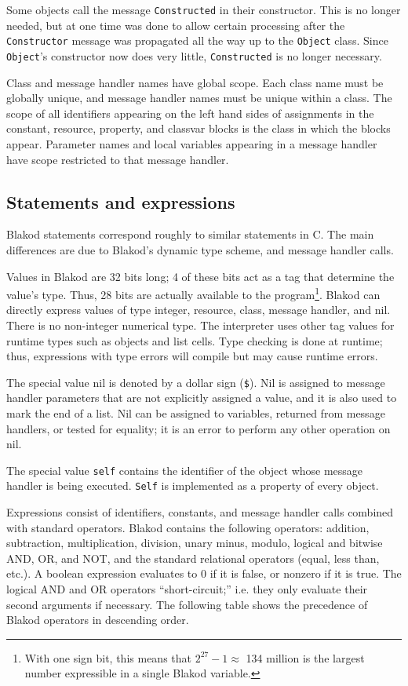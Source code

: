 Some objects call the message {\tt Constructed} in their constructor.
This is no longer needed, but at one time was done to allow certain
processing after the {\tt Constructor} message was propagated
all the way up to the {\tt Object} class.  Since {\tt Object}'s
constructor now does very little, {\tt Constructed} is no longer necessary.

Class and message handler names have global scope. Each class name
must be globally unique, and message handler names must be unique
within a class.  The scope of all identifiers appearing on the left
hand sides of assignments in the constant, resource, property, and
classvar blocks is the class in which the blocks appear.  Parameter
names and local variables appearing in a message handler have scope
restricted to that message handler.

\subsection{Statements and expressions}

Blakod statements correspond roughly to similar statements in C.  The
main differences are due to Blakod's dynamic type scheme, and message
handler calls.

Values in Blakod are 32 bits long; 4 of these bits act as a tag that
determine the value's type.  Thus, 28 bits are actually available to
the program\footnote{With one sign bit, this means that $2^{27} - 1
\approx $
134 million is the largest number expressible in a single Blakod
variable.}.  Blakod can directly express values of type integer,
resource, class, message handler, and nil.  There is no non-integer
numerical type.  The interpreter uses other tag values for runtime
types such as objects and list cells.  Type checking is done at
runtime; thus, expressions with type errors will compile but may cause
runtime errors.

The special value nil is denoted by a dollar sign ({\tt \$}).  Nil is
assigned to message handler parameters that are not explicitly
assigned a value, and it is also used to mark the end of a list.  Nil
can be assigned to variables, returned from message handlers, or
tested for equality; it is an error to perform any other operation on
nil.

The special value {\tt self} contains the identifier of the object
whose message handler is being executed.  {\tt Self} is implemented as a
property of every object.

Expressions consist of identifiers, constants, and message handler
calls combined with standard operators.  Blakod contains the following
operators: addition, subtraction, multiplication, division, unary
minus, modulo, logical and bitwise AND, OR, and NOT, and the standard
relational operators (equal, less than, etc.).  A boolean expression
evaluates to 0 if it is false, or nonzero if it is true.  The logical
AND and OR operators ``short-circuit;'' i.e. they only evaluate their
second arguments if necessary.  The following table shows the
precedence of Blakod operators in descending order.

